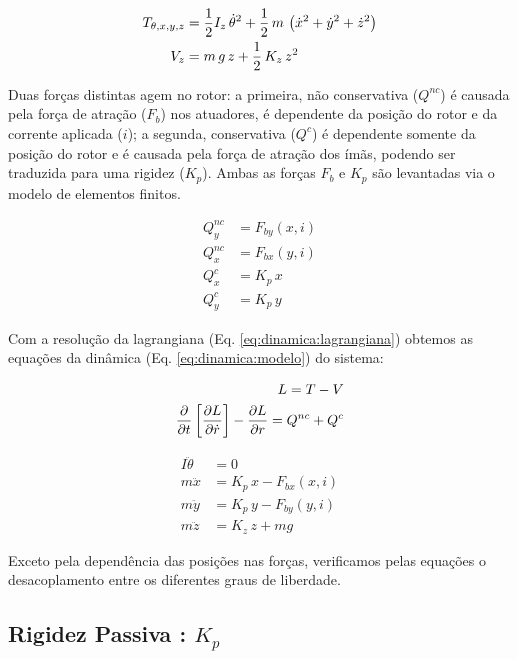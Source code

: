  \begin{align}
 	T_{\theta, x, y, z} &= \frac{1}{2} I_z \, \dot{\theta}^2 + \frac{1}{2} \, m \, \left( \dot{x}^2 + \dot{y}^2 + \dot{z}^2 \right) \notag \\
 	V_z &= m \, g \, z + \frac{1}{2} \, K_z \, z^2
 \end{align}	
 	
 Duas forças distintas agem no rotor: a primeira, não conservativa ($Q^{nc}$) é causada pela força de atração ($F_b$) nos atuadores, é dependente da posição do rotor e da corrente aplicada ($i$); a segunda, conservativa ($Q^{c}$) é dependente somente da posição do rotor e é causada pela força de atração dos ímãs, podendo ser traduzida para uma rigidez ($K_p$). Ambas as forças $F_b$ e $K_p$ são levantadas via o modelo de elementos finitos. 
	 	
 \begin{align}
 	Q_y^{nc} &= F_{by}(x,i)  \\
 	Q_x^{nc} &= F_{bx}(y,i)  \\
 	Q^{c}_x  &= K_p \, x \\
 	Q^{c}_y  &= K_p \, y 
 \end{align}
  
  Com a resolução da lagrangiana (Eq. \ref{eq:dinamica:lagrangiana}) obtemos as equações da dinâmica (Eq. \ref{eq:dinamica:modelo}) do sistema:
  
   \begin{align}
   		L = T - V \notag \\
   		\frac{\partial}{\partial t} \left[ \frac{\partial L}{\partial \dot{r}} \right] -  \frac{\partial L}{\partial r} = Q^{nc} + Q^{c}
   		\label{eq:dinamica:lagrangiana}
   \end{align}
  
 	\begin{align}
 	I \ddot{\theta} &= 0 \\
 	m \ddot{x}		&= K_p \, x  - F_{bx}(x,i) \\
 	m \ddot{y}		&= K_p \, y  - F_{by}(y,i) \label{eq:dinamica:rotor:radial}\\	
 	m \ddot{z}  	&= K_z \, z + m g 
 	\label{eq:dinamica:modelo}
 	\end{align}	
 
 Exceto pela dependência das posições nas forças, verificamos pelas equações o desacoplamento entre os diferentes graus de liberdade. 

\subsection{Rigidez Passiva : $K_p$}

